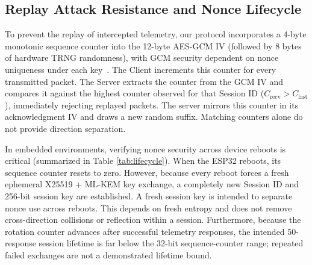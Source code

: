 \documentclass[journal, 10pt]{IEEEtran}
\begin{document}
\subsection{Replay Attack Resistance and Nonce Lifecycle}
To prevent the replay of intercepted telemetry, our protocol incorporates a 4-byte monotonic sequence counter into the 12-byte AES-GCM IV (followed by 8 bytes of hardware TRNG randomness), with GCM security dependent on nonce uniqueness under each key~\cite{b22}. The Client increments this counter for every transmitted packet. The Server extracts the counter from the GCM IV and compares it against the highest counter observed for that Session ID ($C_{\text{recv}} > C_{\text{last}}$), immediately rejecting replayed packets. The server mirrors this counter in its acknowledgment IV and draws a new random suffix. Matching counters alone do not provide direction separation.

In embedded environments, verifying nonce security across device reboots is critical (summarized in Table \ref{tab:lifecycle}). When the ESP32 reboots, its sequence counter resets to zero. However, because every reboot forces a fresh ephemeral X25519 + ML-KEM key exchange, a completely new Session ID and 256-bit session key are established. A fresh session key is intended to separate nonce use across reboots. This depends on fresh entropy and does not remove cross-direction collisions or reflection within a session. Furthermore, because the rotation counter advances after successful telemetry responses, the intended 50-response session lifetime is far below the 32-bit sequence-counter range; repeated failed exchanges are not a demonstrated lifetime bound.

\begin{table}[htbp]
\caption{IV and Key Lifecycle State Machine}
\begin{center}
\label{tab:lifecycle}
\end{center}
\end{table}
\end{document}

